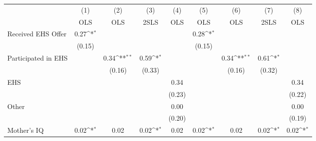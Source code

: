 {
\def\sym#1{\ifmmode^{#1}\else\(^{#1}\)\fi}
\begin{tabular}{l*{8}{c}}
\hline\hline
                    &\multicolumn{1}{c}{(1)}&\multicolumn{1}{c}{(2)}&\multicolumn{1}{c}{(3)}&\multicolumn{1}{c}{(4)}&\multicolumn{1}{c}{(5)}&\multicolumn{1}{c}{(6)}&\multicolumn{1}{c}{(7)}&\multicolumn{1}{c}{(8)}\\
                    &\multicolumn{1}{c}{OLS}&\multicolumn{1}{c}{OLS}&\multicolumn{1}{c}{2SLS}&\multicolumn{1}{c}{OLS}&\multicolumn{1}{c}{OLS}&\multicolumn{1}{c}{OLS}&\multicolumn{1}{c}{2SLS}&\multicolumn{1}{c}{OLS}\\
\hline
Received EHS Offer  &        0.27\sym{*}  &                     &                     &                     &        0.28\sym{*}  &                     &                     &                     \\
                    &      (0.15)         &                     &                     &                     &      (0.15)         &                     &                     &                     \\
[1em]
Participated in EHS &                     &        0.34\sym{**} &        0.59\sym{*}  &                     &                     &        0.34\sym{**} &        0.61\sym{*}  &                     \\
                    &                     &      (0.16)         &      (0.33)         &                     &                     &      (0.16)         &      (0.32)         &                     \\
[1em]
EHS                 &                     &                     &                     &        0.34         &                     &                     &                     &        0.34         \\
                    &                     &                     &                     &      (0.23)         &                     &                     &                     &      (0.22)         \\
[1em]
Other               &                     &                     &                     &        0.00         &                     &                     &                     &        0.00         \\
                    &                     &                     &                     &      (0.20)         &                     &                     &                     &      (0.19)         \\
[1em]
Mother's IQ         &        0.02\sym{*}  &        0.02         &        0.02\sym{*}  &        0.02         &        0.02\sym{*}  &        0.02         &        0.02\sym{*}  &        0.02\sym{*}  \\

\end{tabular}}
